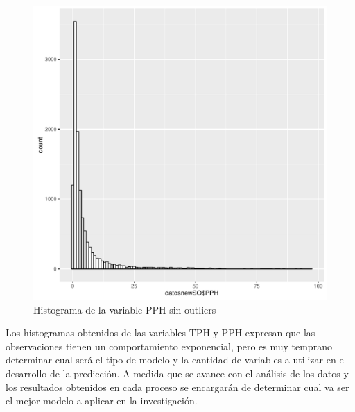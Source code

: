 \documentclass[conference]{IEEEtran}\usepackage[]{graphicx}\usepackage[]{color}
\makeatletter
\def\maxwidth{ %
  \ifdim\Gin@nat@width>\linewidth
    \linewidth
  \else
    \Gin@nat@width
  \fi
}
\newenvironment{knitrout}{}{} %
\makeatother
\begin{document}
\vspace{-6mm}
\begin{figure}[H]
	\centering
\begin{knitrout}
\color{fgcolor}
\includegraphics[width=\maxwidth]{figure/sinatipicos2-1} 

\end{knitrout}
	\caption{Histograma de la variable PPH sin outliers}
\end{figure}
\vspace{-6mm}
Los histogramas obtenidos de las variables TPH y PPH expresan que las observaciones tienen un comportamiento exponencial, pero es muy temprano determinar cual será el tipo de modelo y la cantidad de variables a utilizar en el desarrollo de la predicción. A medida que se avance con el análisis de los datos y los resultados obtenidos en cada proceso se encargarán de determinar cual va ser el mejor modelo a aplicar en la investigación.        
\vspace{-6mm}
\end{document}
